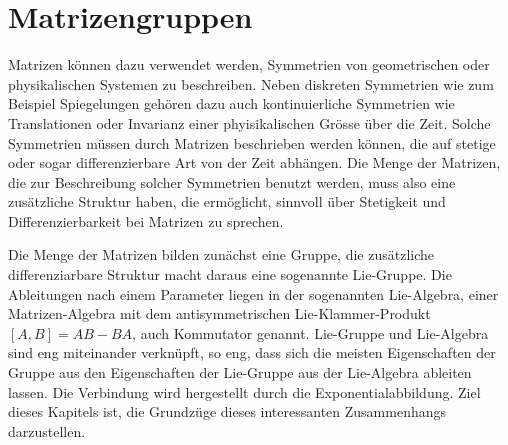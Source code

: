 %
%
%
\chapter{Matrizengruppen
\label{buch:chapter:matrizengruppen}}
\rhead{}
Matrizen können dazu verwendet werden, Symmetrien von geometrischen oder
physikalischen Systemen zu beschreiben.
Neben diskreten Symmetrien wie zum Beispiel Spiegelungen gehören dazu
auch kontinuierliche Symmetrien wie Translationen oder Invarianz einer
phyisikalischen Grösse über die Zeit.
Solche Symmetrien müssen durch Matrizen beschrieben werden können,
die auf stetige oder sogar differenzierbare Art von der Zeit abhängen.
Die Menge der Matrizen, die zur Beschreibung solcher Symmetrien benutzt
werden, muss also eine zusätzliche Struktur haben, die ermöglicht, 
sinnvoll über Stetigkeit und Differenzierbarkeit bei Matrizen
zu sprechen.

Die Menge der Matrizen bilden zunächst eine Gruppe,
die zusätzliche differenziarbare Struktur macht daraus
eine sogenannte Lie-Gruppe.
Die Ableitungen nach einem Parameter liegen in der sogenannten
Lie-Algebra, einer Matrizen-Algebra mit dem antisymmetrischen
Lie-Klammer-Produkt $[A,B]=AB-BA$, auch Kommutator genannt.
Lie-Gruppe und Lie-Algebra sind eng miteinander verknüpft,
so eng, dass sich die meisten Eigenschaften der Gruppe aus den Eigenschaften
der Lie-Gruppe aus der Lie-Algebra ableiten lassen.
Die Verbindung wird hergestellt durch die Exponentialabbildung.
Ziel dieses Kapitels ist, die Grundzüge dieses interessanten 
Zusammenhangs darzustellen.




%



